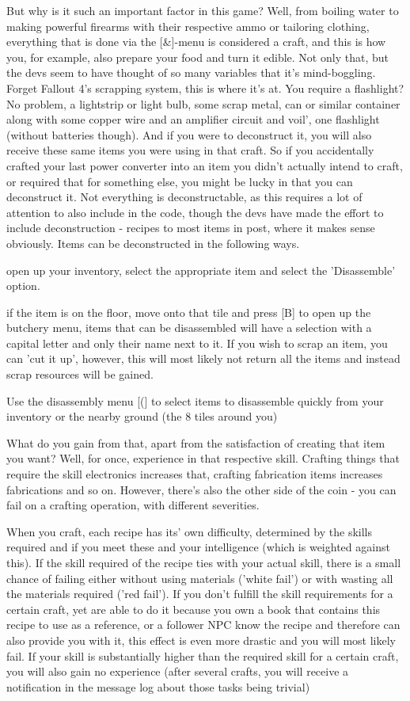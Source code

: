 But why is it such an important factor in this game? Well, from boiling water to making powerful firearms with their respective ammo or tailoring clothing, everything that is done via the [\&]-menu is considered a craft, and this is how you, for example, also prepare your food and turn it edible. Not only that, but the devs seem to have thought of so many variables that it's mind-boggling. Forget Fallout 4's scrapping system, this is where it's at. You require a flashlight? No problem, a lightstrip or light bulb, some scrap metal, can or similar container along with some copper wire and an amplifier circuit and voil', one flashlight (without batteries though). And if you were to deconstruct it, you will also receive these same items you were using in that craft. So if you accidentally crafted your last power converter into an item you didn't actually intend to craft, or required that for something else, you might be lucky in that you can deconstruct it. Not everything is deconstructable, as this requires a lot of attention to also include in the code, though the devs have made the effort to include deconstruction - recipes to most items in post, where it makes sense obviously. Items can be deconstructed in the following ways.

open up your inventory, select the appropriate item and select the 'Disassemble' option.

if the item is on the floor, move onto that tile and press [B] to open up the butchery menu, items that can be disassembled will have a selection with a capital letter and only their name next to it. If you wish to scrap an item, you can 'cut it up', however, this will most likely not return all the items and instead scrap resources will be gained.

Use the disassembly menu [(] to select items to disassemble quickly from your inventory or the nearby ground (the 8 tiles around you)

What do you gain from that, apart from the satisfaction of creating that item you want? Well, for once, experience in that respective skill. Crafting things that require the skill electronics increases that, crafting fabrication items increases fabrications and so on. However, there's also the other side of the coin - you can fail on a crafting operation, with different severities.

When you craft, each recipe has its' own difficulty, determined by the skills required and if you meet these and your intelligence (which is weighted against this). If the skill required of the recipe ties with your actual skill, there is a small chance of failing either without using materials ('white fail') or with wasting all the materials required ('red fail'). If you don't fulfill the skill requirements for a certain craft, yet are able to do it because you own a book that contains this recipe to use as a reference, or a follower NPC know the recipe and therefore can also provide you with it, this effect is even more drastic and you will most likely fail. If your skill is substantially higher than the required skill for a certain craft, you will also gain no experience (after several crafts, you will receive a notification in the message log about those tasks being trivial)

